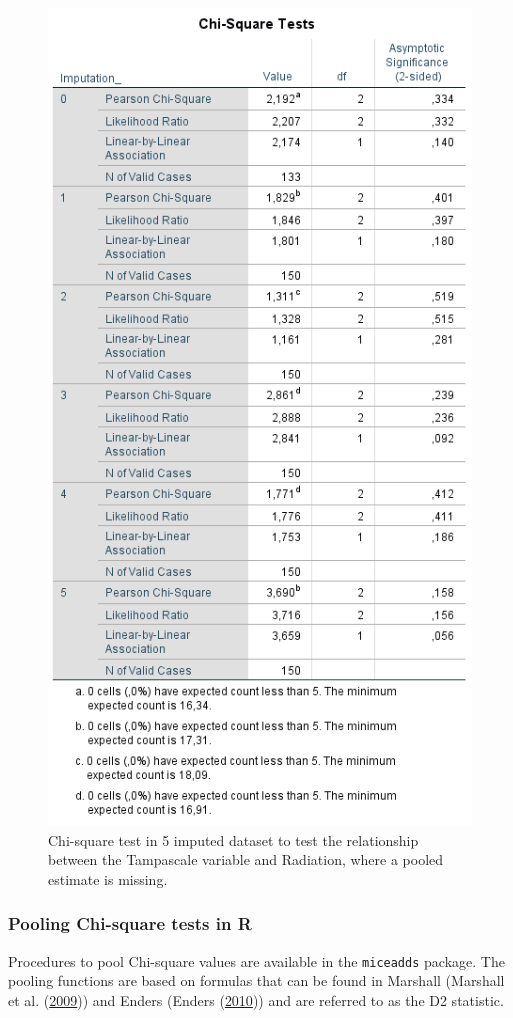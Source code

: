 \documentclass[
]{book}
\begin{document}
\begin{figure}

{\centering \includegraphics[width=0.7\linewidth]{images/table5.6} 

}

\caption{Chi-square test in 5 imputed dataset to test the relationship between the Tampascale variable and Radiation, where a pooled estimate is missing.}\label{fig:tab5-6}
\end{figure}

\hypertarget{pooling-chi-square-tests-in-r}{%
\subsubsection{Pooling Chi-square tests in
R}\label{pooling-chi-square-tests-in-r}}

Procedures to pool Chi-square values are available in the
\texttt{miceadds} package. The pooling functions are based on formulas
that can be found in Marshall (Marshall et al.
(\protect\hyperlink{ref-Marshall2009MedResMeth}{2009})) and Enders
(Enders (\protect\hyperlink{ref-enders2010applied}{2010})) and are
referred to as the D2 statistic.
\end{document}
